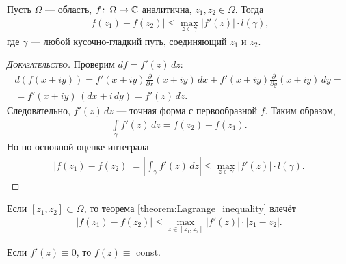 \documentclass[../complex-analysis.tex]{subfiles}
\begin{document}
\begin{thm}
 \label{theorem:Lagrange_inequality}
 Пусть $ \Omega $ --- область, $ f \colon\, \Omega \to \mathbb{C} $ аналитична, $ z_1, z_2 \in \Omega $. Тогда
 \begin{align*}
  \left| f(z_1) - f(z_2) \right| \leqslant \max_{z \in \gamma} \left| f'(z) \right| \cdot l(\gamma),
 \end{align*} где $ \gamma $ --- любой кусочно-гладкий путь, соединяющий $ z_1 $ и $ z_2 $.
\end{thm}
\begin{proof}[\normalfont\textsc{Доказательство}]
 Проверим $ df = f'(z) \, dz$:
 \begin{align*}
  d(f(x+iy)) = f'(x+iy) \frac{\partial}{\partial x}(x+iy)\,dx + f'(x +iy) \frac{\partial}{\partial y}(x+iy)\,dy = \\
  =f'(x+iy)\,(dx + i\,dy) = f'(z)\,dz.
 \end{align*} Следовательно, $ f'(z)\,dz $ --- точная форма с первообразной $ f $. Таким образом,
 \begin{align*}
  \int\limits_{\gamma}  f'(z)\,dz = f(z_2) - f(z_1).
 \end{align*} Но по основной оценке интеграла
 \begin{align*}
  \left| f(z_1) - f(z_2) \right| = \left| \int_{\gamma} f'(z)\,dz   \right| \leqslant \max_{z \in \gamma} \left| f'(z) \right| \cdot l(\gamma).
 \end{align*} 
\end{proof}
\begin{remrk}
  Если $ [z_1, z_2] \subset \Omega $, то теорема \eqref{theorem:Lagrange_inequality} влечёт\
 \begin{align*}
  \left| f(z_1) - f(z_2) \right| \leqslant \max_{z \in [z_1, z_2]} \left| f'(z) \right| \cdot \left| z_1 - z_2 \right|.
 \end{align*} 
\end{remrk}
\begin{remrk}
	Если $f'(z) \equiv 0$, то $f(z) \equiv$ const.  
\end{remrk}
\end{document}
